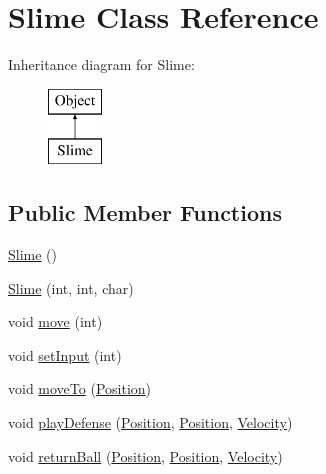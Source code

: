 \hypertarget{classSlime}{\section{Slime Class Reference}
\label{classSlime}
}
Inheritance diagram for Slime\-:\begin{figure}[H]
\begin{center}
\leavevmode
\includegraphics[height=2.000000cm]{classSlime}
\end{center}
\end{figure}
\subsection*{Public Member Functions}
\begin{DoxyCompactItemize}
\item 
\hyperlink{classSlime_a311bc6c56df2c1f7660a08634e560db6}{Slime} ()
\item 
\hyperlink{classSlime_ae3f09154eb9ffeb1e3f40914f85e7fb8}{Slime} (int, int, char)
\item 
void \hyperlink{classSlime_a369c16e49e7cbc425c7486d9e914ecc5}{move} (int)
\item 
void \hyperlink{classSlime_a825cc65a1acef3382eb986567b9f9639}{set\-Input} (int)
\item 
void \hyperlink{classSlime_a8cb4328663278acf60995d2d47894f14}{move\-To} (\hyperlink{structPosition}{Position})
\item 
void \hyperlink{classSlime_a3f7637800c973e4e8fbdf899e911c59e}{play\-Defense} (\hyperlink{structPosition}{Position}, \hyperlink{structPosition}{Position}, \hyperlink{structVelocity}{Velocity})
\item 
void \hyperlink{classSlime_af50875e65a9a9a1ce4880ba4b4864436}{return\-Ball} (\hyperlink{structPosition}{Position}, \hyperlink{structPosition}{Position}, \hyperlink{structVelocity}{Velocity})
\end{DoxyCompactItemize}
